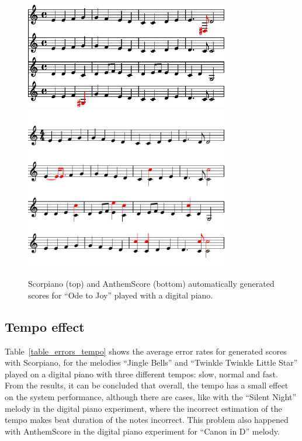 \documentclass[conference]{IEEEtran}
\begin{document}
\begin{figure}[bt]
\centering
\vspace{-10pt}
\includegraphics[clip, width=3.5in]{ode_to_joy_piano}
\includegraphics[clip, width=3.5in]{ode_to_joy_anthemscore}
\caption{Scorpiano (top) and AnthemScore (bottom) automatically generated scores for ``Ode to Joy'' played with a digital piano.}
\label{fig_ode_joy_piano}
\vspace{+2pt}
\end{figure}

\subsection{Tempo effect}

Table~\ref{table_errors_tempo} shows the average error rates for generated scores with Scorpiano, for the melodies ``Jingle Bells'' and ``Twinkle Twinkle Little Star'' played on a digital piano with three different tempos: slow, normal and fast.
From the results, it can be concluded that overall, the tempo has a small effect on the system performance, although there are cases, like with the ``Silent Night'' melody in the digital piano experiment, where the incorrect estimation of the tempo makes beat duration of the notes incorrect.
This problem also happened with AnthemScore in the digital piano experiment for ``Canon in D'' melody.
\end{document}
